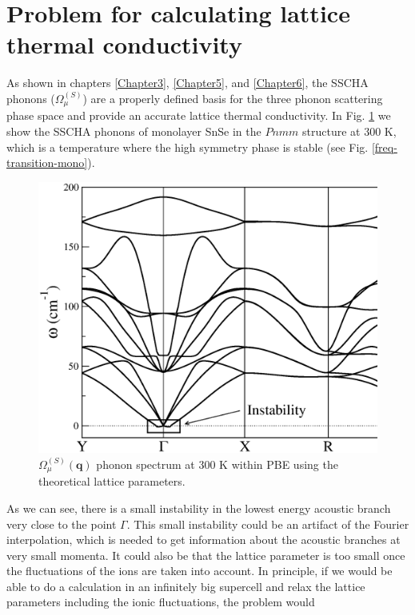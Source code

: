 \section{Problem for calculating lattice thermal conductivity}

As shown in chapters \ref{Chapter3}, \ref{Chapter5}, and \ref{Chapter6}, the SSCHA phonons ($\Omega^{(S)}_{\mu}$) are 
a properly defined basis for the three phonon scattering phase space and provide an accurate lattice thermal 
conductivity. In Fig. \ref{sscha-freq-mono} we show the SSCHA phonons of monolayer SnSe in the $Pnmm$ structure at 
$300$ K, which is a temperature where the high symmetry phase is stable (see Fig. \ref{freq-transition-mono}).
\begin{figure}[h]
\includegraphics[width=\linewidth]{Figures/sscha-mono.eps}
\caption[Anharmonic phonons in monolayer SnSe.]{$\Omega^{(S)}_{\mu}(\boldsymbol{q})$ phonon spectrum at $300$ K 
within PBE using the theoretical lattice parameters.}
\label{sscha-freq-mono}
\end{figure}
As we can see, there is a small instability in the lowest energy acoustic branch very close to the point $\Gamma$. 
This small instability could be an artifact of the Fourier interpolation, which is needed to get information about 
the acoustic branches at very small momenta. It could also be that the lattice parameter is too small once the 
fluctuations of the ions are taken into account. In principle, if we would be able to do a calculation in an 
infinitely big supercell and relax the lattice parameters including the ionic fluctuations, the problem would 
